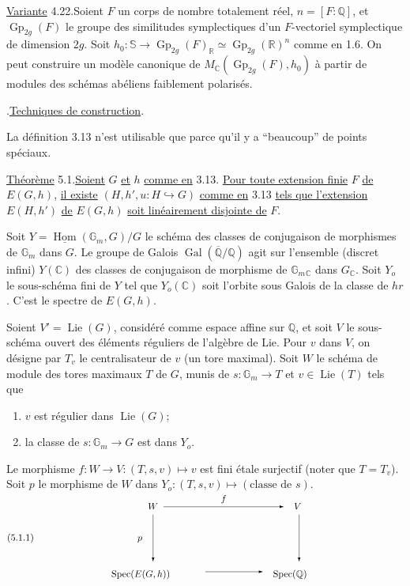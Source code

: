 \documentclass[10pt]{article}
\newcommand{\C}{\mathbb C}
\newcommand{\Gm}{\mathbb G_m}
\newcommand{\Q}{\mathbb Q}
\newcommand{\R}{\mathbb R}
\newcommand{\bS}{\mathbb S}
\newcommand{\Gp}{\operatorname{Gp}}
\newcommand{\Hom}{\operatorname{Hom}}
\newcommand{\Lie}{\operatorname{Lie}}
\newcommand{\Gal}{\operatorname{Gal}}
\newcommand{\Spec}{\operatorname{Spec}}
\begin{document}
\noindent \uline{Variante} 4.22.\quad Soient $F$ un corps de nombre totalement réel, $n=[F:\Q]$, et $\Gp_{2g}(F)$ le groupe des similitudes symplectiques d'un $F$-vectoriel symplectique de dimension $2g$. Soit $h_0:\bS\longrightarrow \Gp_{2g}(F)_\R\simeq \Gp_{2g}(\R)^n$ comme en 1.6. On peut construire un modèle canonique de $M_{\C}(\Gp_{2g}(F),h_0)$ à partir de modules des schémas abéliens faiblement polarisés.

\par\vspace{1.1em}
.\quad \uline{Techniques de construction}.\par\vspace{0.9em}

La définition 3.13 n'est utilisable que parce qu'il y a ``beaucoup'' de points spéciaux.

\noindent \uline{Théorème} 5.1.\quad \uline{Soient} $G$ \uline{et} $h$ \uline{comme en} 3.13. \uline{Pour toute extension finie} $F$ \uline{de} $E(G,h)$, \uline{il existe} $(H,h',u:H\hookrightarrow G)$ \uline{comme en} 3.13 \uline{tels que l'extension} $E(H,h')$ \uline{de} $E(G,h)$ \uline{soit linéairement disjointe de} $F$.

Soit $Y=\underline{\Hom}(\Gm,G)/G$ le schéma des classes de conjugaison de morphismes de $\Gm$ dans $G$. Le groupe de Galois $\Gal(\overline{\Q}/\Q)$ agit sur l'ensemble (discret infini) $Y(\C)$ des classes de conjugaison de morphisme de $\Gm{}_{\C}$ dans $G_{\C}$. Soit $Y_o$ le sous-schéma fini de $Y$ tel que $Y_o(\C)$ soit l'orbite sous Galois de la classe de $hr$. C'est le spectre de $E(G,h)$.

Soient $V'=\Lie(G)$, considéré comme espace affine sur $\Q$, et soit $V$ le sous-schéma ouvert des éléments réguliers de l'algèbre de Lie. Pour $v$ dans $V$, on désigne par $T_v$ le centralisateur de $v$ (un tore maximal). Soit $W$ le schéma de module des tores maximaux $T$ de $G$, munis de $s:\Gm\longrightarrow T$ et $v\in\Lie(T)$ tels que
\begin{enumerate}[label=(\alph*)]
\item $v$ est régulier dans $\Lie(G)$;
\item la classe de $s:\Gm\to G$ est dans $Y_o$.
\end{enumerate}
Le morphisme $f:W\longrightarrow V:(T,s,v)\longmapsto v$ est fini étale surjectif (noter que $T=T_v$). Soit $p$ le morphisme de $W$ dans $Y_o:(T,s,v)\longmapsto(\text{classe de }s)$.
\[
\begingroup
\setlength{\unitlength}{0.55em}
\begin{picture}(76,15)
\put(0,7){\((5.1.1)\)}
\put(27,13){\(W\)}
\put(55,13){\(V\)}
\put(20,0){\(\Spec(E(G,h))\)}
\put(51,0){\(\Spec(\Q)\)}
\put(30,13.5){\vector(1,0){23}}
\put(41,14.5){\(f\)}
\put(28,12){\vector(0,-1){9}}
\put(25,7){\(p\)}
\put(56,12){\vector(0,-1){9}}
\put(38,1){\vector(1,0){11}}
\end{picture}
\endgroup
\]
\end{document}
